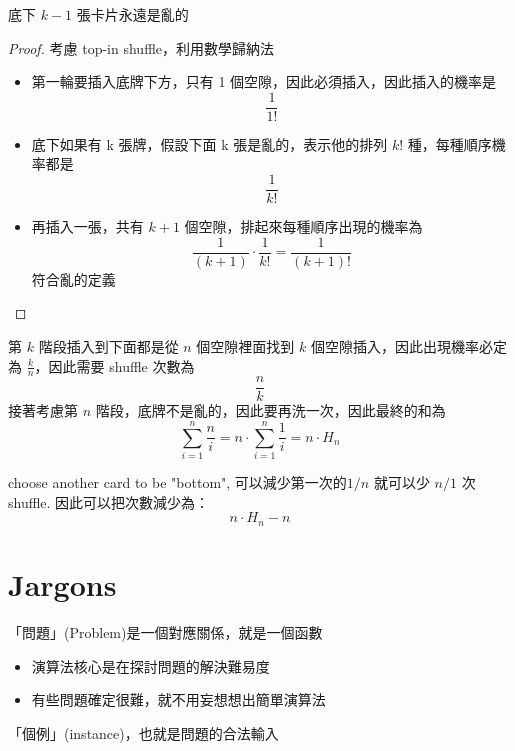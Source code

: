 \newpage

\begin{theorem}
    底下 $k-1$ 張卡片永遠是亂的
\end{theorem}
\begin{proof}
    考慮 top-in shuffle，利用數學歸納法
    \begin{itemize}
        \item 第一輪要插入底牌下方，只有 1 個空隙，因此必須插入，因此插入的機率是 \[
        \frac{1}{1!}
        \]
        \item 底下如果有 k 張牌，假設下面 k 張是亂的，表示他的排列 $k!$ 種，每種順序機率都是 \[
        \frac{1}{k!}
        \]
        \item 再插入一張，共有 $k+1$ 個空隙，排起來每種順序出現的機率為 \[
        \frac{1}{(k+1)} \cdot \frac{1}{k!} = \frac{1}{(k+1)!}
        \]
        符合亂的定義
    \end{itemize}
\end{proof}

第 $k$ 階段插入到下面都是從 $n$ 個空隙裡面找到 $k$ 個空隙插入，因此出現機率必定為 \(\frac{k}{n}\)，因此需要 shuffle 次數為\[
\frac{n}{k}
\]
接著考慮第 $n$ 階段，底牌不是亂的，因此要再洗一次，因此最終的和為\[
\sum_{i=1}^{n} \frac{n}{i} = n \cdot \sum_{i=1}^{n}\frac{1}{i} = n\cdot H_n
\]

\begin{note}
    choose another card to be "bottom", 可以減少第一次的$1/n$ 就可以少 $n/1$ 次 shuffle. 因此可以把次數減少為：
    \[
        n\cdot H_n - n
    \]
\end{note}

\begin{remark}
\end{remark}

\section{Jargons}
\begin{definition}[Problems]
    「問題」(Problem)是一個對應關係，就是一個函數
    \begin{itemize}
        \item 演算法核心是在探討問題的解決難易度
        \item 有些問題確定很難，就不用妄想想出簡單演算法
    \end{itemize}
\end{definition}

\begin{definition}[Instance]
    「個例」(instance)，也就是問題的合法輸入
\end{definition}

